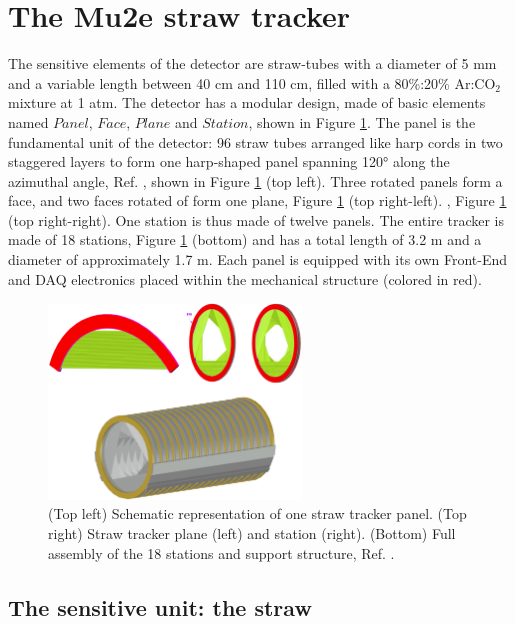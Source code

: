 \section{The Mu2e straw tracker}\label{geomtra}
The sensitive elements of the detector are straw-tubes with a diameter of 5 mm and a variable length between 40 cm and 110 cm, 
filled with a 80\%:20\% Ar:CO$_2$ mixture at 1 atm.  
The detector has a modular design, made of basic elements named $Panel$, $Face$, 
$Plane$ and $Station$, shown in Figure \ref{fig:trkpanel}. 
The panel is the fundamental unit of the detector: 96 straw tubes arranged like 
harp cords in two staggered layers to form one harp-shaped panel spanning 120° along the azimuthal angle, Ref. \cite{bartoszek2015mu2e}, 
shown in Figure \ref{fig:trkpanel} (top left).
Three rotated panels form a face, and two faces rotated of  form one plane, Figure \ref{fig:trkpanel} (top right-left). 
,
%
Figure \ref{fig:trkpanel} (top right-right).
One station is thus made of twelve panels. The entire tracker is made of 18 stations, Figure \ref{fig:trkpanel} (bottom) 
and has a total length of 3.2 m and a diameter of approximately 1.7 m.
Each panel is equipped with its own Front-End and DAQ electronics placed within the mechanical structure (colored in red).
\begin{figure}[!h]
\centering
\includegraphics[width =0.6\textwidth]{figures/png/Screenshot_20240306_222803.png}
\caption[The straw tracker components.]{(Top left) Schematic representation of one straw tracker panel. (Top right) 
Straw tracker plane (left) and station (right). (Bottom) Full assembly of the 18 
stations and support structure, Ref. \cite{bartoszek2015mu2e}.}
\label{fig:trkpanel}
\end{figure}
\subsection{The sensitive unit: the straw}

